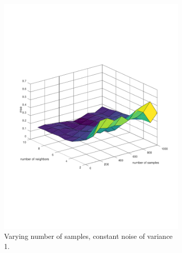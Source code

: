 \documentclass[]{article}
\begin{document}
\begin{figure}[ht]
\centering
\begin{subfigure}{.49\textwidth}
	\centering
	\includegraphics[trim= 10cm 5cm 10cm 5cm, scale=0.4]{proj1-3_2d-neighbors}
	\caption{Varying number of samples, constant noise of variance 1.}
	\label{proj1-3_2d-neighbors}
\end{subfigure}
\begin{subfigure}{.49\textwidth}
	\centering

\end{subfigure}
\end{figure}
\end{document}

